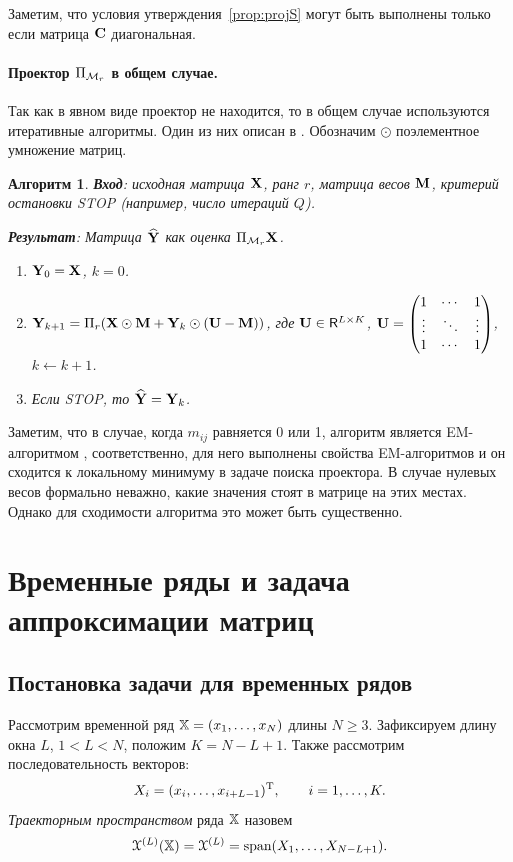 \documentclass[12pt,a4paper,fleqn,leqno]{article}
\newtheorem{algorithm}{Алгоритм}%
\begin{document}
\begin{remark}
Заметим, что условия утверждения~\ref{prop:projS} могут быть выполнены только если матрица $\mathbf{C}$ диагональная.
\end{remark}

\paragraph{Проектор $\Pi_{\mathcal{M}_r}$ в общем случае.}
Так как в явном виде проектор не находится, то в общем случае используются итеративные алгоритмы.
Один из них описан в \cite{Srebro2003}. Обозначим $\odot$ поэлементное умножение матриц.

\begin{algorithm}
\label{alg:weightedSVD}
\textbf{Вход}: исходная матрица $\mathbf{X}$, ранг $r$, матрица весов $\mathbf{M}$,
критерий остановки STOP (например, число итераций $Q$).

\textbf{Результат}:
Матрица $\widehat{\mathbf{Y}}$ как оценка $\Pi_{\mathcal{M}_r} \mathbf{X}$.

\begin{enumerate}
\item
$\mathbf{Y}_0 = \mathbf{X}$, $k=0$.
\item
$\mathbf{Y}_{k+1} = \Pi_r(\mathbf{X} \odot \mathbf{M} + \mathbf{Y}_{k} \odot (\mathbf{U} -  \mathbf{M}))$, где
$\mathbf{U} \in \mathsf{R}^{L \times K}$,  $\mathbf{U} = \begin{pmatrix}
1 & \cdots & 1 \\
\vdots & \ddots & \vdots \\
1 & \cdots & 1
\end{pmatrix}$, $k\leftarrow k+1$.
\item
Если STOP, то $\widehat{\mathbf{Y}} = \mathbf{Y}_k$.
\end{enumerate}
\end{algorithm}

Заметим, что в случае, когда $m_{ij}$ равняется 0 или 1, алгоритм является EM-алгоритмом \cite{Srebro2003},
соответственно, для него выполнены свойства EM-алгоритмов и он сходится к локальному минимуму в задаче поиска проектора.
В случае нулевых весов формально неважно, какие значения стоят в матрице на этих местах. Однако для сходимости алгоритма
это может быть существенно.

\section{Временные ряды и задача аппроксимации матриц}
\label{sec:ts_matrices}
\subsection{Постановка задачи для временных рядов}
Рассмотрим временной ряд $\mathbb{X} = (x_1, \ldots, x_N)$ длины $N \ge 3$. Зафиксируем длину окна $L$, $1 < L < N$, положим $K = N - L + 1$. Также рассмотрим последовательность векторов:
\begin{equation}\label{l_lagged}
X_i = (x_i, \ldots, x_{i + L - 1})^{\mathrm{T}}, \qquad i = 1, \ldots, K.
\end{equation}
\emph{Траекторным пространством} ряда $\mathbb{X}$ назовем $$\EuScript{X}^{(L)}(\mathbb{X}) = \EuScript{X}^{(L)} = \text{span}(X_1, \ldots, X_{N-L+1}).$$
\end{document}
